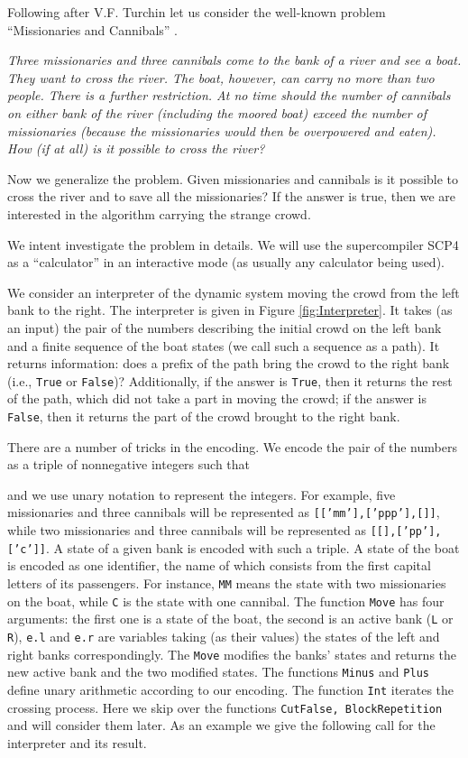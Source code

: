 \documentclass[preprint]{sigplanconf}
\begin{document}
Following after V.F. Turchin let us consider the well-known problem ``Missionaries and Cannibals'' \cite{Turchin:Refal5}. 

\emph{Three missionaries and three cannibals come to the bank of a river and see a boat. They want to cross the river. The boat, however, can carry no more than two people. There is a further restriction. At no time should the number of cannibals on either bank of the river (including the moored boat) exceed the number of missionaries (because the missionaries would then be overpowered and eaten). How (if at all) is it possible to cross the river?}

Now we generalize the problem. Given  missionaries and  cannibals is it possible to cross the river and to save all the missionaries? If the answer is true, then we are interested in the algorithm carrying the strange crowd.

We intent investigate the problem in details. We will use the supercompiler SCP4 as a ``calculator'' in
an interactive mode (as usually any calculator being used). 

We consider an interpreter of the dynamic system moving the crowd from the left bank to the right. 
The interpreter is given in Figure \ref{fig:Interpreter}. 
It takes (as an input) the pair of the numbers  describing the initial crowd on the left bank and a finite sequence of the boat states (we call such a sequence as a path). It returns information: does a prefix of the path bring the crowd to the right bank (i.e., \texttt{True} or \texttt{False})? Additionally, if the answer is \texttt{True}, then it returns the rest of the path, which did not take a part in moving the crowd; if the answer is \texttt{False}, then it returns the part of the crowd brought to the right bank.

There are a number of tricks in the encoding. We encode the pair of the numbers  as a triple of nonnegative integers  such that 
 
and we use unary notation to represent the integers. For example, five missionaries and three cannibals will be represented as \texttt{[['mm'],['ppp'],[]]}, while two missionaries and three cannibals will be represented as \texttt{[[],['pp'],['c']]}. A state of a given bank is encoded with such a triple. A state of the boat is encoded as one identifier, the name of which consists from the first capital letters of its passengers. For instance, \texttt{MM} means the state with two missionaries on the boat, while \texttt{C} is the state with one cannibal. The function \texttt{Move} has four arguments: the first one is a state of the boat, the second is an active bank (\texttt{L} or \texttt{R}), \texttt{e.l} and \texttt{e.r} are variables taking (as their values) the states of the left and right banks correspondingly. The \texttt{Move} modifies the banks' states and returns the new active bank and the two modified states. The functions \texttt{Minus} and \texttt{Plus} define unary arithmetic according to our encoding. The function \texttt{Int} iterates the crossing process. Here we skip over the functions \texttt{CutFalse, BlockRepetition} and will consider them later. As an example we give the following call for the interpreter and its result.
\end{document}

